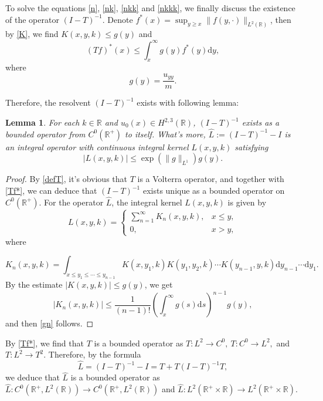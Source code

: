 \documentclass[11pt]{article}
\numberwithin{equation}{section}
\newtheorem{lemma}{Lemma}
\begin{document}
To solve the equations \eqref{n}, \eqref{nk}, \eqref{nkk} and \eqref{nkkk}, we finally discuss the existence of the operator $(I-T)^{-1}$. Denote $f^*(x)=\displaystyle\sup_{y\geqslant x}\| f(y,\cdot)\|_{L^2(\mathbb{R})}$, then by \eqref{K}, we find $K(x,y,k)\leqslant g(y)$ and
\begin{equation}\label{Tf*}
(Tf)^*(x)\leqslant\int_x^{\infty}g(y)f^*(y)\mathrm{d}y,
\end{equation}
where
\begin{equation*}
g(y)=\frac{u_{yy}}{m}.
\end{equation*}

Therefore, the resolvent $(I-T)^{-1}$ exists with following lemma:
\begin{lemma}\label{revol}
For each $k\in\mathbb{R}$ and $u_0(x) \in H^{2,3}(\mathbb{R})$, $(I-T)^{-1}$ exists as a bounded operator from $C^0(\mathbb{R}^+)$ to itself. What's more, $\hat{L}:=(I-T)^{-1}-I$ is an integral operator with continuous integral kernel $L(x,y,k)$ satisfying
\begin{equation}\label{gn}
|L(x,y,k)|\leqslant \exp(\| g\|_{L^1})g(y).
\end{equation}
\end{lemma}
\begin{proof}
By \eqref{defT}, it's obvious that $T$ is a Volterra operator, and together with \eqref{Tf*}, we can deduce that $(I-T)^{-1}$ exists unique as a bounded operator on $C^0(\mathbb{R}^+)$. For the operator $\hat{L}$, the integral kernel $L(x,y,k)$ is given by
\begin{equation*}
L(x,y,k)=\left\{\begin{array}{ll}
\sum_{n=1}^{\infty}K_n(x,y,k),&x\leqslant y,\\
0,&x>y,
\end{array}\right.
\end{equation*}
where

\begin{equation*}
K_n(x,y,k)=\int_{x\leqslant y_1\leqslant\cdots\leqslant y_{n-1}}K(x,y_1,k)K(y_1,y_2,k)\cdots K(y_{n-1},y,k)\mathrm{d}y_{n-1}\cdots \mathrm{d}y_1.
\end{equation*}
By the estimate $|K(x,y,k)|\leqslant g(y)$, we get
\begin{equation*}
|K_n(x,y,k)|\leqslant\frac{1}{(n-1)!}\left(\int_x^{\infty}g(s)\mathrm{d}s\right)^{n-1}g(y),
\end{equation*}
and then \eqref{gn} follows.
\end{proof}

By \eqref{Tf*}, we find that $T$ is a bounded operator as $T:L^2\to C^0,\ T:C^0\to L^2,$ and $T:L^2\to T^2$. Therefore, by the formula
\begin{equation*}
\hat{L}=(I-T)^{-1}-I=T+T(I-T)^{-1}T,
\end{equation*}
we deduce that $\hat{L}$ is a bounded operator as
$\hat{L}:C^0(\mathbb{R}^+,L^2(\mathbb{R}))\to C^0(\mathbb{R}^+,L^2(\mathbb{R}))$ and $\hat{L}:L^2(\mathbb{R}^+\times\mathbb{R})\to L^2(\mathbb{R}^+\times\mathbb{R})$.
\end{document}
